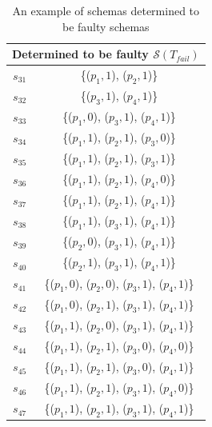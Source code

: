 \begin{table}[htbp]
  \centering
  \caption{An example of schemas determined to be faulty schemas}
  \label{ex:determinablefaultyschemas}
    \begin{tabular}{|c|c|} \hline
  \multicolumn{2}{|c|}{\textbf{Determined to be faulty $\mathcal{S}(T_{fail})$ }}  \\ \hline
   $s_{31}$ & \{($p_{1}, 1$), ($p_{2}, 1$)\}  \\
   $s_{32}$ & \{($p_{3}, 1$), ($p_{4}, 1$)\}  \\

   $s_{33}$ & \{($p_{1}, 0$), ($p_{3}, 1$), ($p_{4}, 1$)\}  \\

   $s_{34}$ & \{($p_{1}, 1$), ($p_{2}, 1$), ($p_{3}, 0$)\}  \\
   $s_{35}$ & \{($p_{1}, 1$), ($p_{2}, 1$), ($p_{3}, 1$)\}  \\
   $s_{36}$ & \{($p_{1}, 1$), ($p_{2}, 1$), ($p_{4}, 0$)\}  \\
   $s_{37}$ & \{($p_{1}, 1$), ($p_{2}, 1$), ($p_{4}, 1$)\}  \\

   $s_{38}$ & \{($p_{1}, 1$), ($p_{3}, 1$), ($p_{4}, 1$)\}  \\
   $s_{39}$ & \{($p_{2}, 0$), ($p_{3}, 1$), ($p_{4}, 1$)\}  \\
   $s_{40}$ & \{($p_{2}, 1$), ($p_{3}, 1$), ($p_{4}, 1$)\}  \\


  $s_{41}$ & \{($p_{1}, 0$), ($p_{2}, 0$), ($p_{3}, 1$), ($p_{4}, 1$)\}\\
  $s_{42}$ & \{($p_{1}, 0$), ($p_{2}, 1$), ($p_{3}, 1$), ($p_{4}, 1$)\}\\
  $s_{43}$ & \{($p_{1}, 1$), ($p_{2}, 0$), ($p_{3}, 1$), ($p_{4}, 1$)\}\\

  $s_{44}$ & \{($p_{1}, 1$), ($p_{2}, 1$), ($p_{3}, 0$), ($p_{4}, 0$)\}\\
  $s_{45}$ & \{($p_{1}, 1$), ($p_{2}, 1$), ($p_{3}, 0$), ($p_{4}, 1$)\}\\
  $s_{46}$ & \{($p_{1}, 1$), ($p_{2}, 1$), ($p_{3}, 1$), ($p_{4}, 0$)\}\\

  $s_{47}$ & \{($p_{1}, 1$), ($p_{2}, 1$), ($p_{3}, 1$), ($p_{4}, 1$)\}\\

  \hline
    \end{tabular}%
\end{table}



